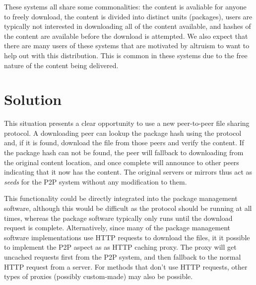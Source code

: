 \documentclass[conference]{IEEEtran}
\begin{document}
These systems all share some commonalities: the content is avaliable
for anyone to freely download, the content is divided into distinct
units (packages), users are typically not interested in downloading
all of the content available, and hashes of the content are
available before the download is attempted. We also expect that
there are many users of these systems that are motivated by
altruism to want to help out with this distribution. This is common
in these systems due to the free nature of the content being
delivered.


\section{Solution}

This situation presents a clear opportunity to use a new
peer-to-peer file sharing protocol.
A downloading peer can lookup the package hash using the protocol and, if it
is found, download the file from those peers and verify the content.
If the package hash can not be found, the peer will
fallback to downloading from the original content location, and once
complete will announce to other peers indicating that it now has
the content. The original servers or mirrors thus act as \emph{seeds} for the
P2P system without any modification to them.

This functionality could be directly integrated into the
package management software, although this would be
difficult as the protocol should be running at all times, whereas the
package software typically only runs until the download request is complete.
Alternatively, since many of the package management software
implementations use HTTP requests to download the files, it
it possible to implement the P2P aspect as as HTTP caching
proxy. The proxy will get uncached requests first from the P2P system,
and then fallback to the normal HTTP request from a server. For
methods that don't use HTTP requests, other types of proxies
(possibly custom-made) may also be possible.
\end{document}
